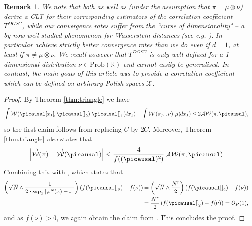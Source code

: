 \documentclass[10pt]{amsart}
\newtheorem{remark}[theorem]{Remark}
\newcommand{\R}{\mathbb{R}}
\begin{document}
\begin{remark}
We note that both \cite[Theorem 5.1]{dette2013copula} as well as \cite[Theorem 2.2]{chatterjee2020new} (under the assumption that $\pi=\mu\otimes\nu$) derive a CLT for their corresponding estimators of the correlation coefficient $T^{DGSC}$, while our convergence rates suffer from the ``curse of dimensionality" -- a by now well-studied phenomenon for Wasserstein distances (see e.g. \cite{fournier2015rate,weed2017sharp}). In particular \cite{dette2013copula,chatterjee2020new} achieve strictly better convergence rates than we do even if $d=1$, at least if $\pi\neq \mu\otimes \nu$. We recall however that $T^{DGSC}$ is only well-defined for a 1-dimensional distribution $\nu\in \mathrm{Prob}(\R)$ and cannot easily be generalised. In contrast, the main goals of this article was to provide a correlation coefficient which can be defined on arbitrary Polish spaces $\mathcal{X}$.
\end{remark}


\begin{proof}
By Theorem \ref{thm:triangle} we have
\begin{align*}
\int \mathcal{W}\left(\picausal[x_1],\picausal[]_2\right)\,\picausal[]_1(dx_1) -\int \mathcal{W}\left(\pi_{x_1},\nu\right)\,\mu(dx_1)\le 2 \mathcal{AW}(\pi,\picausal),
\end{align*}
so the first claim follows from \cite[Lemma 1.3]{jwb} replacing $C$ by $2C$.
Moreover, Theorem \ref{thm:triangle} also states that
\begin{align*}
\left| \overrightarrow{\mathcal{W}}(\pi)-\overrightarrow{\mathcal{W}}(\picausal) \right|\le \frac{4 }{f((\picausal)^2)}\, \mathcal{AW}(\pi,\picausal)
\end{align*}
Combining this with \cite[Lemma 1.2]{jwb}, which states that
\begin{align*}
\left(\sqrt{N}\wedge \frac{1}{2\cdot \sup_{x} |\varphi^N(x)-x|} \right)\left(f(\picausal[]_2)-f(\nu)\right)
&=\left(\sqrt{N}\wedge \frac{N^r}{2}\right)\left(f(\picausal[]_2)-f(\nu)\right)\\
&= \frac{N^r}{2}\left(f(\picausal[]_2)-f(\nu)\right)=O_P(1),
\end{align*}
and as $f(\nu)>0$, 
we again obtain the claim from \cite[Lemma 1.3]{jwb}.
This concludes the proof.
\end{proof}
\end{document}
